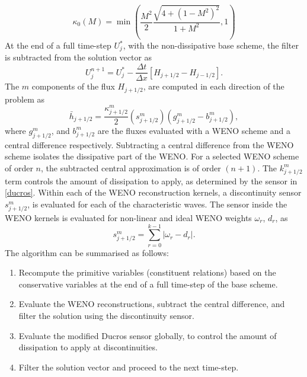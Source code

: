 \documentclass[11pt]{article}
\begin{document}
\begin{equation}
\kappa_0(M) = \min \left(\frac{M^{2}}{2} \frac{\sqrt{4+\left(1-M^{2}\right)^{2}}}{1+M^{2}}, 1\right)
\end{equation}
At the end of a full time-step $U_{j}^{*}$, with the non-dissipative base scheme, the filter is subtracted from the solution vector as
\begin{equation}
U_{j}^{n+1}=U_{j}^{*}-\frac{\Delta t}{\Delta x}\left[H_{j+1 / 2}-H_{j-1 / 2}\right].
\end{equation}
The $m$ components of the flux $H_{j+1 / 2}$, are computed in each direction of the problem as 
\begin{equation}
\bar{h}_{j+1 / 2}=\frac{\kappa_{j+1 / 2}^{m}}{2}\left(s_{j+1 / 2}^{m}\right)\left(g_{j+1 / 2}^{m}-b_{j+1 / 2}^{m}\right),
\end{equation}
where $g_{j+1 / 2}^{m}$, and $b_{j+1 / 2}^{m}$ are the fluxes evaluated with a WENO scheme and a central difference respectively. Subtracting a central difference from the WENO scheme isolates the dissipative part of the WENO. For a selected WENO scheme of order $n$, the subtracted central approximation is of order $\left(n+1\right)$. The $k_{j+1 / 2}^{m}$ term controls the amount of dissipation to apply, as determined by the sensor in \eqref{ducros}. Within each of the WENO reconstruction kernels, a discontinuity sensor $s_{j+1 / 2}^{m}$, is evaluated for each of the characteristic waves. The sensor inside the WENO kernels is evaluated for non-linear and ideal WENO weights $\omega_r$, $d_r$, as
\begin{equation}
s_{j+1 / 2}^{m} = \sum_{r=0}^{k-1} \left| \omega_r - d_r \right|.
\end{equation}
The algorithm can be summarised as follows:

\begin{enumerate}
\item{Recompute the primitive variables (constituent relations) based on the conservative variables at the end of a full time-step of the base scheme.}
\item{Evaluate the WENO reconstructions, subtract the central difference, and filter the solution using the discontinuity sensor.}
\item{Evaluate the modified Ducros sensor globally, to control the amount of dissipation to apply at discontinuities.}
\item{Filter the solution vector and proceed to the next time-step.}
\end{enumerate}
\end{document}
